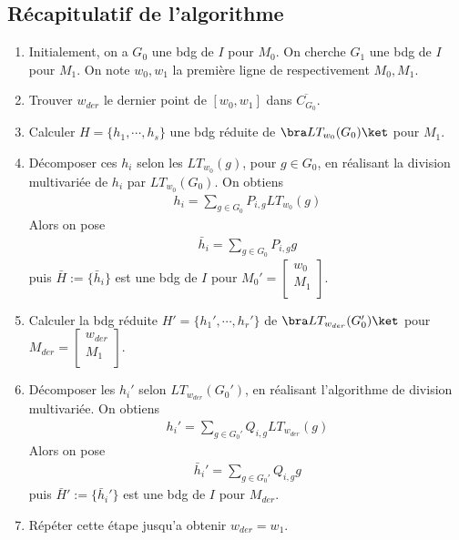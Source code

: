         \subsection{Récapitulatif de l'algorithme}
            \begin{enumerate}
                \item Initialement, on a $G_0$ une bdg de $I$ pour $M_0$. On cherche $G_1$ une bdg de $I$ pour $M_1$. On note $w_0, w_1$ la première ligne de respectivement $M_0, M_1$. 
                \item Trouver $w_{der}$ le dernier point de $[w_0, w_1]$ dans $\overline{C_{G_0}}$.
                \item Calculer $H = \{h_1, \cdots, h_s\}$ une bdg réduite de $\bra LT_{w_0}(G_0) \ket$ pour $M_1$.
                \item Décomposer ces $h_i$ selon les $LT_{w_0}(g)$, pour $g \in G_0$, en réalisant la division multivariée de $h_i$ par $LT_{w_0}(G_0)$. On obtiens
                \begin{align*}
                    h_i = \sum_{g \in G_0} P_{i,g} LT_{w_0}(g)
                \end{align*}
                Alors on pose
                \begin{align*}
                    \bar h_i = \sum_{g \in G_0} P_{i,g} g
                \end{align*}
                puis $\bar H := \{\bar h_i \}$ est une bdg de $I$ pour $M_0' = \begin{bmatrix} w_0 \\ M_1 \\ \end{bmatrix}$.
                \item Calculer la bdg réduite $H' = \{h_1', \cdots, h_r'\}$ de $\bra LT_{w_{der}}(G_0') \ket$ pour $M_{der} = \begin{bmatrix} w_{der} \\ M_1 \\ \end{bmatrix}$.
                \item Décomposer les $h_i'$ selon $LT_{w_{der}}(G_0')$, en réalisant l'algorithme de division multivariée. On obtiens
                \begin{align*}
                    h_i' = \sum_{g \in G_0'} Q_{i,g} LT_{w_{der}}(g)
                \end{align*}
                Alors on pose 
                \begin{align*}
                    \bar h_i' = \sum_{g \in G_0'} Q_{i,g} g
                \end{align*}
                puis $\bar H' := \{\bar h_i' \}$ est une bdg de $I$ pour $M_{der}$.
                \item Répéter cette étape jusqu'a obtenir $w_{der} = w_1$.
            \end{enumerate}